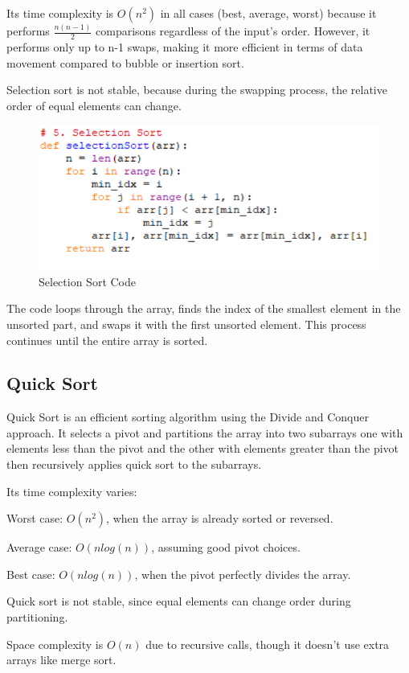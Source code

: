 \documentclass[sigconf]{acmart}
\begin{document}
Its time complexity is $O(n^2)$ in all cases (best, average, worst) because it performs $\frac{n(n-1)}{2}$ comparisons regardless of the input's order.
However, it performs only up to n-1 swaps, making it more efficient in terms of data movement compared to bubble or insertion sort.

Selection sort is not stable, because during the swapping process, the relative order of equal elements can change.

\begin{figure}[t]
\centering
\includegraphics[width=0.85\linewidth]{figures/005.pdf}
\vspace{-0.3cm}
\caption{Selection Sort Code}  
\vspace{-0.35cm}
\label{fig:proportion}
\end{figure}

The code loops through the array, finds the index of the smallest element in the unsorted part, and swaps it with the first unsorted element. This process continues until the entire array is sorted.
\subsection{Quick Sort}
Quick Sort is an efficient sorting algorithm using the Divide and Conquer approach. It selects a pivot and partitions the array into two subarrays one with elements less than the pivot and the other with elements greater than the pivot then recursively applies quick sort to the subarrays.

Its time complexity varies:

Worst case: $O(n^2)$, when the array is already sorted or reversed.

Average case: $O(nlog(n))$, assuming good pivot choices.

Best case: $O(nlog(n))$, when the pivot perfectly divides the array.

Quick sort is not stable, since equal elements can change order during partitioning.

Space complexity is $O(n)$ due to recursive calls, though it doesn't use extra arrays like merge sort.
\end{document}
